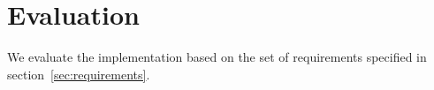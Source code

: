 
\chapter{Evaluation}\label{evaluation}

We evaluate the implementation based on the set of requirements specified in section~\ref{sec:requirements}.
